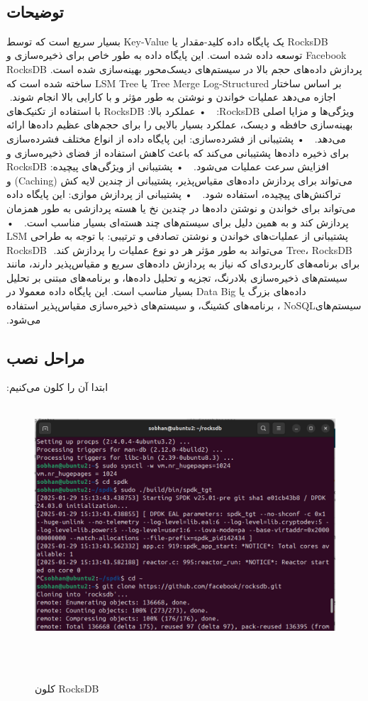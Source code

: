 ‫\subsection*{توضیحات}
‫RocksDB یک پایگاه داده کلید-مقدار یا Key-Value  بسیار سریع است که توسط Facebook توسعه داده شده است. این پایگاه داده به طور خاص برای ذخیره‌سازی و پردازش داده‌های حجم بالا در سیستم‌های دیسک‌محور بهینه‌سازی شده است. RocksDB بر اساس ساختار Tree Merge Log-Structured یا LSM Tree ساخته شده است که اجازه می‌دهد عملیات خواندن و نوشتن به طور مؤثر و با کارایی بالا انجام شوند.
‫
‫ویژگی‌ها و مزایا اصلی RocksDB:
‫
‫    • عملکرد بالا: RocksDB با استفاده از تکنیک‌های بهینه‌سازی حافظه و دیسک، عملکرد بسیار بالایی را برای حجم‌های عظیم داده‌ها ارائه می‌دهد.
‫
‫    • پشتیبانی از فشرده‌سازی: این پایگاه داده از انواع مختلف فشرده‌سازی برای ذخیره داده‌ها پشتیبانی می‌کند که باعث کاهش استفاده از فضای ذخیره‌سازی و افزایش سرعت عملیات می‌شود.
‫
‫    • پشتیبانی از ویژگی‌های پیچیده: RocksDB می‌تواند برای پردازش داده‌های مقیاس‌پذیر، پشتیبانی از چندین لایه کش (Caching) و تراکنش‌های پیچیده، استفاده شود.
‫
‫    • پشتیبانی از پردازش موازی: این پایگاه داده می‌تواند برای خواندن و نوشتن داده‌ها در چندین نخ یا هسته پردازشی به طور همزمان پردازش کند و به همین دلیل برای سیستم‌های چند هسته‌ای بسیار مناسب است.
‫
‫    • پشتیبانی از عملیات‌های خواندن و نوشتن تصادفی و ترتیبی: با توجه به طراحی LSM Tree، RocksDB می‌تواند به طور مؤثر هر دو نوع عملیات را پردازش کند.
‫
‫RocksDB برای برنامه‌های کاربردی‌ای که نیاز به پردازش داده‌های سریع و مقیاس‌پذیر دارند، مانند سیستم‌های ذخیره‌سازی بلادرنگ، تجزیه و تحلیل داده‌ها، و برنامه‌های مبتنی بر تحلیل داده‌های بزرگ یا Data Big بسیار مناسب است. این پایگاه داده معمولا در سیستم‌هایNoSQL ، برنامه‌های کشینگ، و سیستم‌های ذخیره‌سازی مقیاس‌پذیر استفاده می‌شود.
‫‫\subsection*{مراحل نصب}
‫ابتدا آن را کلون می‌کنیم:
‫
‫\begin{figure}[H]
‫    \centering
‫    \includegraphics[width=\textwidth]{figs/1.png}
‫    \caption{کلون RocksDB}
‫\end{figure}
